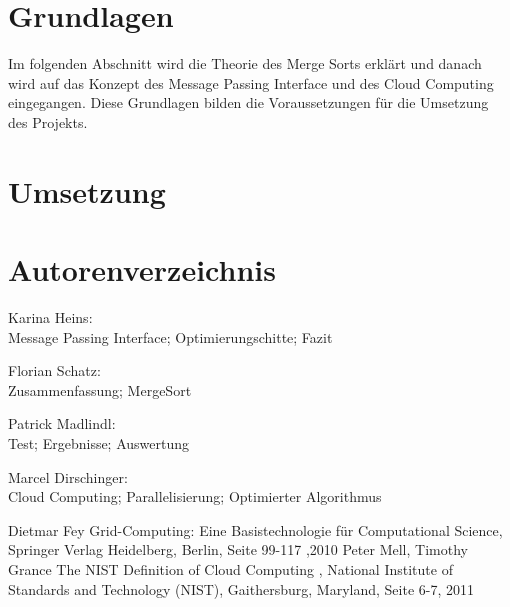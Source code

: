 \documentclass[conference]{IEEEtran}
\begin{document}
\section{Grundlagen}
Im folgenden Abschnitt wird die Theorie des Merge Sorts erklärt und danach wird auf das Konzept des Message Passing Interface und des Cloud Computing eingegangen. Diese Grundlagen bilden die Voraussetzungen für die Umsetzung des Projekts.




\section{Umsetzung}









\section*{Autorenverzeichnis}
Karina Heins:\\ 
Message Passing Interface; Optimierungschitte; Fazit

Florian Schatz:\\
 Zusammenfassung; MergeSort
 
Patrick Madlindl:\\
 Test; Ergebnisse; Auswertung
 
 Marcel Dirschinger:\\
 Cloud Computing; Parallelisierung; Optimierter Algorithmus

\begin{thebibliography}{00}
 Dietmar Fey \glqq Grid-Computing: Eine Basistechnologie für Computational Science\grqq{}, Springer Verlag Heidelberg, Berlin, Seite 99-117 ,2010
 Peter Mell, Timothy Grance \glqq The NIST Definition of Cloud Computing \grqq{}, National Institute of Standards and Technology (NIST), Gaithersburg, Maryland, Seite 6-7, 2011
\end{thebibliography}
\end{document}
